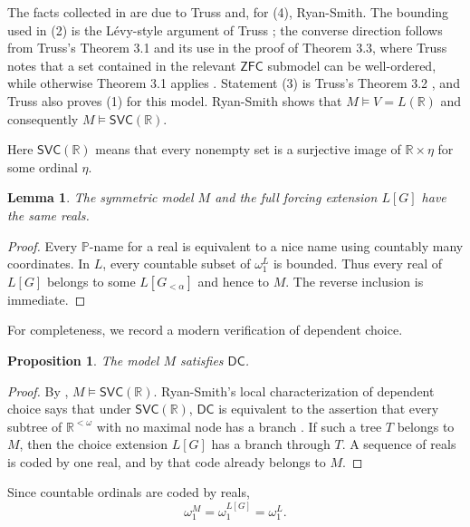 \documentclass[11pt,reqno]{amsart}
\newcommand{\R}{\mathbb R}
\theoremstyle{plain}
\newtheorem{proposition}[proposition]{Proposition}
\newtheorem{lemma}[lemma]{Lemma}
\theoremstyle{definition}
\theoremstyle{remark}
\begin{document}
The facts collected in  are due to Truss and, for (4), Ryan-Smith.
The bounding used in (2) is the L\'evy-style argument of Truss \cite[Lemma 2.4, p.~202]{Truss1974}; the converse direction follows from Truss's Theorem 3.1 and its use in the proof of Theorem 3.3, where Truss notes that a set contained in the relevant $\mathsf{ZFC}$ submodel can be well-ordered, while otherwise Theorem 3.1 applies \cite[Theorem 3.1 and the proof of Theorem 3.3, especially p.~208]{Truss1974}.
Statement (3) is Truss's Theorem 3.2 \cite[Theorem 3.2]{Truss1974}, and Truss also proves (1) for this model.
Ryan-Smith \cite[Proposition 3.19]{RyanSmith2025} shows that $M\models V=L(\R)$ and consequently $M\models\mathsf{SVC}(\R)$.

Here $\mathsf{SVC}(\R)$ means that every nonempty set is a surjective image
of $\R\times\eta$ for some ordinal $\eta$.

\begin{lemma}\label{lem:same-reals}
The symmetric model $M$ and the full forcing extension $L[G]$ have the same
reals.
\end{lemma}

\begin{proof}
Every $\mathbb P$-name for a real is equivalent to a nice name using
countably many coordinates.  In $L$, every countable subset of
$\omega_1^L$ is bounded.  Thus every real of $L[G]$ belongs to some
$L[G_{<\alpha}]$ and hence to $M$.  The reverse inclusion is immediate.
\end{proof}

For completeness, we record a modern verification of dependent choice.

\begin{proposition}\label{prop:dc}
The model $M$ satisfies $\mathsf{DC}$.
\end{proposition}

\begin{proof}
By , $M\models\mathsf{SVC}(\R)$.  Ryan-Smith's local
characterization of dependent choice says that under $\mathsf{SVC}(\R)$,
$\mathsf{DC}$ is equivalent to the assertion that every subtree of
$\R^{<\omega}$ with no maximal node has a branch
\cite[Proposition 3.1]{RyanSmith2025}.  If such a tree $T$ belongs to $M$,
then the choice extension $L[G]$ has a branch through $T$.  A sequence of
reals is coded by one real, and by  that code
already belongs to $M$.
\end{proof}

Since countable ordinals are coded by reals,
\[
 \omega_1^M=\omega_1^{L[G]}=\omega_1^L.
\]
\end{document}
